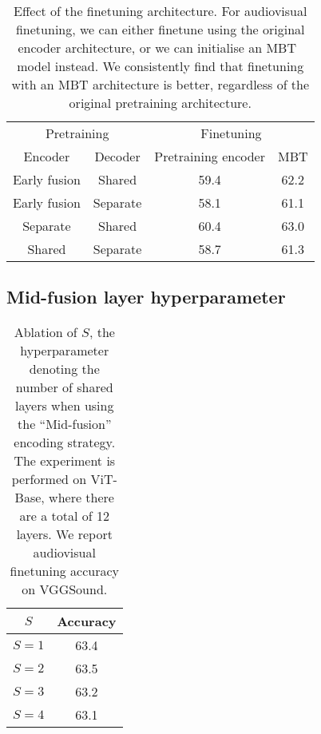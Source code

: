 \documentclass[10pt,twocolumn,letterpaper]{article}
\begin{document}
\begin{table}[t] 
	\caption{Effect of the finetuning architecture.
		For audiovisual finetuning, we can either finetune using the original encoder architecture, or we can initialise an MBT~\cite{nagrani2021attention} model instead.
		We consistently find that finetuning with an MBT architecture is better, regardless of the original pretraining architecture.
	}
	\vspace{-0.6\baselineskip}
	\centering
		\begin{tabular}{cccc}
			\toprule
			\multicolumn{2}{c}{Pretraining} & \multicolumn{2}{c}{Finetuning} \\
			\cmidrule(r){1-2} \cmidrule(l){3-4}
			Encoder & Decoder &  Pretraining encoder &  MBT\\
			\midrule
			
			Early fusion           & Shared     &    59.4  & 62.2         \\
			Early fusion           & Separate   &    58.1  & 61.1      \\
			Separate          & Shared     &       60.4    & 63.0  \\
			Shared            & Separate   &       58.7    & 61.3 \\
			\bottomrule
		\end{tabular}
		\label{tab:ablation_finetuning_arch}
\end{table} 


\subsection{Mid-fusion layer hyperparameter}

\begin{table}[t]  
	\caption{Ablation of $S$, the hyperparameter denoting the number of shared layers when using the ``Mid-fusion'' encoding strategy.
		The experiment is performed on ViT-Base, where there are a total of 12 layers.
		We report audiovisual finetuning accuracy on VGGSound.}
	\centering 
		\begin{tabular}{cc}
			\toprule
			$S$ & Accuracy\\ \midrule 
			$S=1$   &  63.4\\
			$S=2$   &  63.5 \\
			$S=3$   &  63.2 \\  
			$S=4$  &  63.1 \\   
			
			\bottomrule
		\end{tabular}
	\label{tab:ablation_midfusion}
\end{table}
\end{document}
